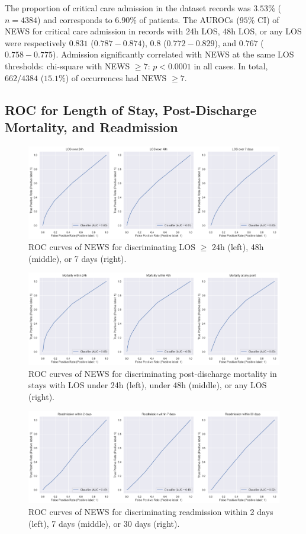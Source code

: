 \documentclass[10pt,journal, compsoc]{IEEEtran}
\begin{document}
The proportion of critical care admission in the dataset records was $3.53\%$ ($n=4384$) and corresponds to $6.90\%$ of patients. The AUROCs ($95\%$ CI) of NEWS for critical care admission in records with 24h LOS, 48h LOS, or any LOS were respectively $0.831$ ($0.787-0.874$), $0.8$ ($0.772-0.829$), and $0.767$ ($0.758-0.775$). Admission significantly correlated with NEWS at the same LOS thresholds: chi-square with NEWS $\geq 7$: $p < 0.0001$ in all cases. In total, $662/4384$ ($15.1\%$) of occurrences had NEWS $\geq 7$.

\subsection{ROC for Length of Stay, Post-Discharge Mortality, and Readmission}
\label{appendix:rocplots}
\begin{figure}[htbp]
    \centering
    \includegraphics[width=\textwidth]{img/los_roc.png}
    \caption{ROC curves of NEWS for discriminating LOS $\geq$ 24h (left), 48h (middle), or 7 days (right).}
    \label{fig:los_roc}
\end{figure}

\begin{figure}[htbp]
    \centering
    \includegraphics[width=\textwidth]{img/30daymortality_roc.png}
    \caption{ROC curves of NEWS for discriminating post-discharge mortality in stays with LOS under 24h (left), under 48h (middle), or any LOS (right).}
    \label{fig:30day_roc}
\end{figure}

\begin{figure}[htbp]
    \centering
    \includegraphics[width=\textwidth]{img/readmission_roc.png}
    \caption{ROC curves of NEWS for discriminating readmission within 2 days (left), 7 days (middle), or 30 days (right).}
    \label{fig:readmission_roc}
\end{figure}
\end{document}
